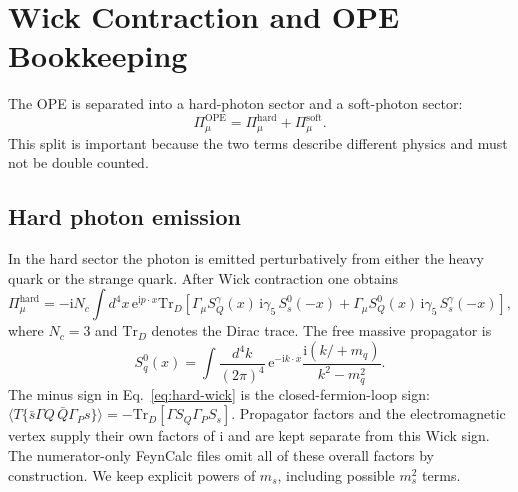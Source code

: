 \documentclass[11pt]{article}
\newcommand{\ii}{\mathrm{i}}
\newcommand{\ee}{\mathrm{e}}
\newcommand{\Tr}{\mathrm{Tr}}
\newcommand{\slashp}[1]{#1\!\!\!/}
\begin{document}
\section{Wick Contraction and OPE Bookkeeping}

The OPE is separated into a hard-photon sector and a soft-photon sector:
\begin{equation}
  \Pi_\mu^{\mathrm{OPE}}
  =
  \Pi_\mu^{\mathrm{hard}}
  +
  \Pi_\mu^{\mathrm{soft}}.
\end{equation}
This split is important because the two terms describe different physics and
must not be double counted.

\subsection{Hard photon emission}

In the hard sector the photon is emitted perturbatively from either the heavy
quark or the strange quark.  After Wick contraction one obtains
\begin{equation}
  \Pi_\mu^{\mathrm{hard}}
  =
  -\ii N_c\int d^4x\,\ee^{\ii p\cdot x}
  \Tr_D\!\left[
    \Gamma_\mu S_Q^\gamma(x)\,\ii\gamma_5\,S_s^0(-x)
    +
    \Gamma_\mu S_Q^0(x)\,\ii\gamma_5\,S_s^\gamma(-x)
  \right],
  \label{eq:hard-wick}
\end{equation}
where $N_c=3$ and $\Tr_D$ denotes the Dirac trace.  The free massive propagator is
\begin{equation}
  S_q^0(x)
  =
  \int\frac{d^4k}{(2\pi)^4}\,\ee^{-\ii k\cdot x}
  \frac{\ii(\slashp{k}+m_q)}{k^2-m_q^2}.
\end{equation}
The minus sign in Eq.~\eqref{eq:hard-wick} is the closed-fermion-loop sign:
$\langle T\{\bar s\Gamma Q\,\bar Q\Gamma_Ps\}\rangle
=-\Tr_D[\Gamma S_Q\Gamma_P S_s]$.  Propagator factors and the electromagnetic
vertex supply their own factors of $\ii$ and are kept separate from this Wick
sign.  The numerator-only FeynCalc files omit all of these overall factors by
construction.
We keep explicit powers of $m_s$, including possible $m_s^2$ terms.
\end{document}
